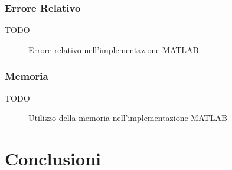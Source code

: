 \documentclass[11pt,italian]{article}
\begin{document}
\subsubsection*{Errore Relativo}
TODO
\begin{figure}[H]
    \caption{Errore relativo nell'implementazione MATLAB}
    \label{fig:matlab-error}
\end{figure}

\subsubsection*{Memoria}
TODO
\begin{figure}[H]
    \caption{Utilizzo della memoria nell'implementazione MATLAB}
    \label{fig:matlab-memory}
\end{figure}

\newpage
\section{Conclusioni}
\end{document}
